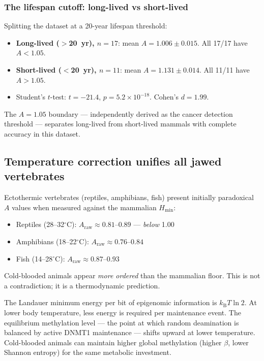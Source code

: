 \documentclass[11pt,a4paper]{article}
\newcommand{\Hmin}{H_{\min}}
\newcommand{\Ascore}{A}
\newcommand{\kB}{k_{\mathrm{B}}}
\begin{document}
\subsubsection{The lifespan cutoff: long-lived vs short-lived}

Splitting the dataset at a 20-year lifespan threshold:
\begin{itemize}
\item \textbf{Long-lived ($>$20~yr), $n=17$}: mean $\Ascore = 1.006 \pm 0.015$.
All 17/17 have $\Ascore < 1.05$.
\item \textbf{Short-lived ($<$20~yr), $n=11$}: mean $\Ascore = 1.131 \pm 0.014$.
All 11/11 have $\Ascore > 1.05$.
\item Student's $t$-test: $t = -21.4$, $p = 5.2 \times 10^{-18}$. Cohen's $d = 1.99$.
\end{itemize}

The $\Ascore = 1.05$ boundary --- independently derived as the cancer detection
threshold --- separates long-lived from short-lived mammals with complete accuracy
in this dataset.

\subsection{Temperature correction unifies all jawed vertebrates}

Ectothermic vertebrates (reptiles, amphibians, fish) present initially
paradoxical $\Ascore$ values when measured against the mammalian $\Hmin$:
\begin{itemize}
\item Reptiles (28--32$^\circ$C): $\Ascore_{\mathrm{raw}} \approx 0.81$--$0.89$ --- \emph{below} 1.00
\item Amphibians (18--22$^\circ$C): $\Ascore_{\mathrm{raw}} \approx 0.76$--$0.84$
\item Fish (14--28$^\circ$C): $\Ascore_{\mathrm{raw}} \approx 0.87$--$0.93$
\end{itemize}

Cold-blooded animals appear \emph{more ordered} than the mammalian floor.
This is not a contradiction; it is a thermodynamic prediction.

The Landauer minimum energy per bit of epigenomic information is $\kB T \ln 2$.
At lower body temperature, less energy is required per maintenance event.
The equilibrium methylation level --- the point at which random deamination is
balanced by active DNMT1 maintenance --- shifts upward at lower temperature.
Cold-blooded animals can maintain higher global methylation (higher $\beta$,
lower Shannon entropy) for the same metabolic investment.
\end{document}

